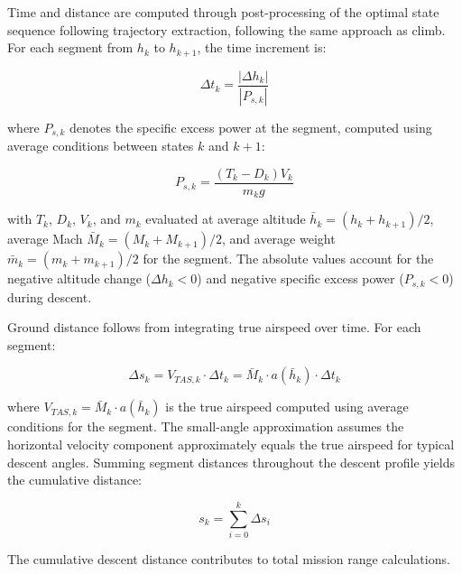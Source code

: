 Time and distance are computed through post-processing of the optimal state sequence following trajectory extraction, following the same approach as climb. For each segment from $h_k$ to $h_{k+1}$, the time increment is:

\begin{equation}
\Delta t_k = \frac{|\Delta h_k|}{|P_{s,k}|}
\end{equation}

where $P_{s,k}$ denotes the specific excess power at the segment, computed using average conditions between states $k$ and $k+1$:

\begin{equation}
P_{s,k} = \frac{(T_k - D_k) V_k}{m_k g}
\end{equation}

with $T_k$, $D_k$, $V_k$, and $m_k$ evaluated at average altitude $\bar{h}_k = (h_k + h_{k+1})/2$, average Mach $\bar{M}_k = (M_k + M_{k+1})/2$, and average weight $\bar{m}_k = (m_k + m_{k+1})/2$ for the segment. The absolute values account for the negative altitude change ($\Delta h_k < 0$) and negative specific excess power ($P_{s,k} < 0$) during descent.

Ground distance follows from integrating true airspeed over time. For each segment:

\begin{equation}
\Delta s_k = V_{TAS,k} \cdot \Delta t_k = \bar{M}_k \cdot a(\bar{h}_k) \cdot \Delta t_k
\end{equation}

where $V_{TAS,k} = \bar{M}_k \cdot a(\bar{h}_k)$ is the true airspeed computed using average conditions for the segment. The small-angle approximation assumes the horizontal velocity component approximately equals the true airspeed for typical descent angles. Summing segment distances throughout the descent profile yields the cumulative distance:

\begin{equation}
s_k = \sum_{i=0}^{k} \Delta s_i
\end{equation}

The cumulative descent distance contributes to total mission range calculations.
